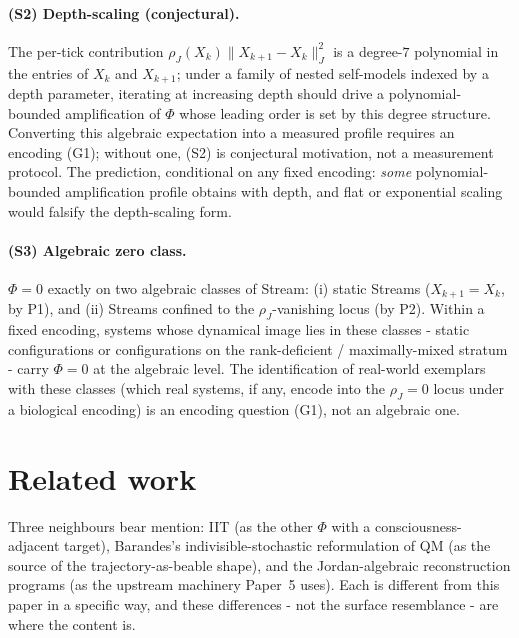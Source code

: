 \documentclass[12pt]{article}
\theoremstyle{remark}
\newcommand{\rhoJ}{\rho_J}
\newcommand{\Phiexp}{\Phi}
\newcommand{\Jnorm}[1]{\lVert #1 \rVert_J}
\begin{document}
\paragraph{(S2) Depth-scaling (conjectural).}
The per-tick contribution $\rhoJ(X_k)\Jnorm{X_{k+1} - X_k}^2$ is a
degree-$7$ polynomial in the entries of $X_k$ and $X_{k+1}$;
under a family of nested self-models indexed by a depth parameter,
iterating at increasing depth should drive a polynomial-bounded
amplification of $\Phiexp$ whose leading order is set by this
degree structure. Converting this algebraic expectation into a
measured profile requires an encoding (G1); without one, (S2) is
conjectural motivation, not a measurement protocol. The prediction,
conditional on any fixed encoding: \emph{some} polynomial-bounded
amplification profile obtains with depth, and flat or exponential
scaling would falsify the depth-scaling form.

\paragraph{(S3) Algebraic zero class.}
$\Phiexp = 0$ exactly on two algebraic classes of Stream: (i) static
Streams ($X_{k+1} = X_k$, by P1), and (ii) Streams confined to the
$\rhoJ$-vanishing locus (by P2). Within a fixed encoding, systems
whose dynamical image lies in these classes - static configurations
or configurations on the rank-deficient / maximally-mixed stratum -
carry $\Phiexp = 0$ at the algebraic level. The identification of
real-world exemplars with these classes (which real systems, if
any, encode into the $\rhoJ = 0$ locus under a biological encoding)
is an encoding question (G1), not an algebraic one.


\section{Related work}
\label{sec:related}

Three neighbours bear mention: IIT (as the other $\Phi$ with a
consciousness-adjacent target), Barandes's indivisible-stochastic
reformulation of QM (as the source of the trajectory-as-beable
shape), and the Jordan-algebraic reconstruction programs (as the
upstream machinery Paper~5 uses). Each is different from this
paper in a specific way, and these differences - not the surface
resemblance - are where the content is.
\end{document}
